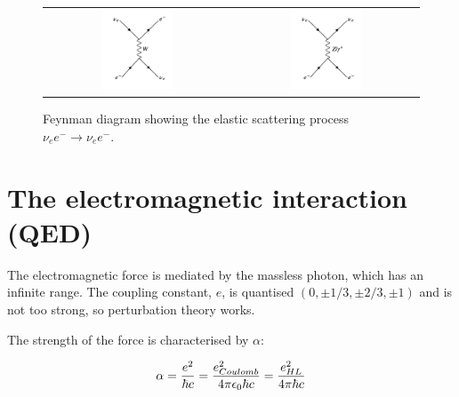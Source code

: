 \begin{figure}[!htb]
  \begin{center}
    \begin{tabular}{cc}
      \includegraphics[width=0.4\textwidth]{images/web_feynman/image_3.png} &
      \includegraphics[width=0.4\textwidth]{images/web_feynman/image_4.png}
    \end{tabular}
    \caption[Feynman diagram of lepton scattering]{Feynman diagram showing the elastic scattering process $\nu_e e^- \to \nu_e e^-$.}
    \label{fig:ch1_ENueToENue}
  \end{center}
\end{figure}

\clearpage

\section{The electromagnetic interaction (QED)}

The electromagnetic force is mediated by the massless photon, which has an infinite range.  The coupling constant, $e$, is quantised $(0,\pm 1/3,\pm 2/3,\pm 1)$ and is not too strong, so perturbation theory works.

The strength of the force is characterised by $\alpha$:

\[
  \alpha = \frac{e^2}{\hbar c} = \frac{e^2_{Coulomb}}{4\pi \epsilon_0 \hbar c} = \frac{e^2_{HL}}{4 \pi \hbar c}
\]

